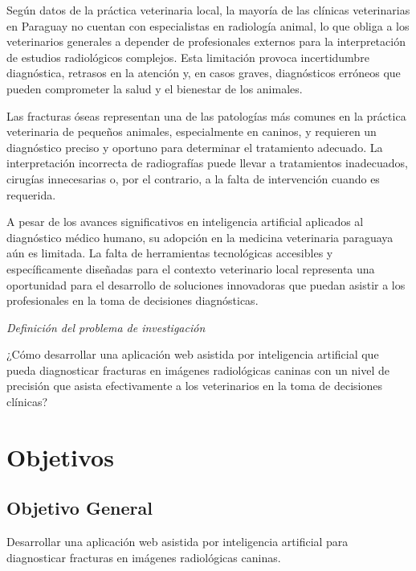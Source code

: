 Según datos de la práctica veterinaria local, la mayoría de las clínicas veterinarias en Paraguay no cuentan con especialistas en radiología animal, lo que obliga a los veterinarios generales a depender de profesionales externos para la interpretación de estudios radiológicos complejos. Esta limitación provoca incertidumbre diagnóstica, retrasos en la atención y, en casos graves, diagnósticos erróneos que pueden comprometer la salud y el bienestar de los animales.

Las fracturas óseas representan una de las patologías más comunes en la práctica veterinaria de pequeños animales, especialmente en caninos, y requieren un diagnóstico preciso y oportuno para determinar el tratamiento adecuado. La interpretación incorrecta de radiografías puede llevar a tratamientos inadecuados, cirugías innecesarias o, por el contrario, a la falta de intervención cuando es requerida.

A pesar de los avances significativos en inteligencia artificial aplicados al diagnóstico médico humano, su adopción en la medicina veterinaria paraguaya aún es limitada. La falta de herramientas tecnológicas accesibles y específicamente diseñadas para el contexto veterinario local representa una oportunidad para el desarrollo de soluciones innovadoras que puedan asistir a los profesionales en la toma de decisiones diagnósticas.

\textit{Definición del problema de investigación}

¿Cómo desarrollar una aplicación web asistida por inteligencia artificial que pueda diagnosticar fracturas en imágenes radiológicas caninas con un nivel de precisión que asista efectivamente a los veterinarios en la toma de decisiones clínicas?

\section{Objetivos}
\subsection{Objetivo General}
Desarrollar una aplicación web asistida por inteligencia artificial para diagnosticar fracturas en imágenes radiológicas caninas.

